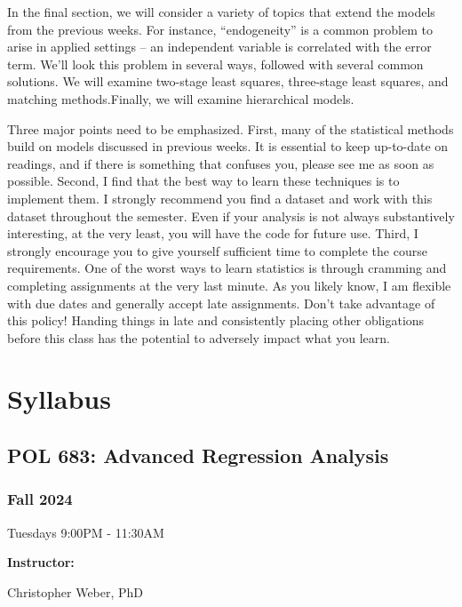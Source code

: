 \documentclass[
]{book}
\begin{document}
In the final section, we will consider a variety of topics that extend the models from the previous weeks. For instance, ``endogeneity'' is a common problem to arise in applied settings -- an independent variable is correlated with the error term. We'll look this problem in several ways, followed with several common solutions. We will examine two-stage least squares, three-stage least squares, and matching methods.Finally, we will examine hierarchical models.

Three major points need to be emphasized. First, many of the statistical methods build on models discussed in previous weeks. It is essential to keep up-to-date on readings, and if there is something that confuses you, please see me as soon as possible. Second, I find that the best way to learn these techniques is to implement them. I strongly recommend you find a dataset and work with this dataset throughout the semester. Even if your analysis is not always substantively interesting, at the very least, you will have the code for future use. Third, I strongly encourage you to give yourself sufficient time to complete the course requirements. One of the worst ways to learn statistics is through cramming and completing assignments at the very last minute. As you likely know, I am flexible with due dates and generally accept late assignments. Don't take advantage of this policy! Handing things in late and consistently placing other obligations before this class has the potential to adversely impact what you learn.

\chapter{Syllabus}\label{syllabus}

\section*{POL 683: Advanced Regression Analysis}\label{pol-683-advanced-regression-analysis}

\subsection*{Fall 2024}\label{fall-2024}

Tuesdays 9:00PM - 11:30AM

\textbf{Instructor:}

Christopher Weber, PhD
\end{document}
